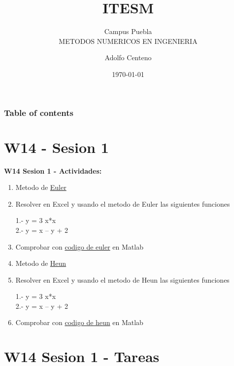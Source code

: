 \documentclass{beamer}
\begin{document}
\title{ITESM}  
\subtitle{Campus Puebla\\METODOS NUMERICOS EN INGENIERIA
}
\author{Adolfo Centeno}
\date{\today} 


\begin{frame}
\titlepage
\end{frame}

\begin{frame}\frametitle{Table of contents}
\tableofcontents
\end{frame} 


\section{W14 - Sesion 1 }

\begin{frame}

\textbf{W14 Sesion 1 - Actividades:}

\begin{enumerate}

\item
	Metodo de \href{https://www.youtube.com/watch?v=V6wLYLvqZ84}{Euler}

\item Resolver en Excel y usando el metodo de Euler las siguientes funciones

1.-  y =  3 x*x \\
2.-  y = x – y + 2

	
\item Comprobar con \href{https://github.com/adsoftsito/metodos-numericos/blob/master/w14/euler.m}{codigo de euler} en Matlab

\item
	Metodo de \href{https://www.youtube.com/watch?v=mE11yv_zQKE}{Heun}

\item Resolver en Excel y usando el metodo de Heun las siguientes funciones

1.-  y =  3 x*x \\
2.-  y = x – y + 2
	
\item Comprobar con \href{https://github.com/adsoftsito/metodos-numericos/blob/master/w14/heun.m}{codigo de heun} en Matlab



\end{enumerate} 

\end{frame}


\section{W14 Sesion 1 - Tareas }
\end{document}
